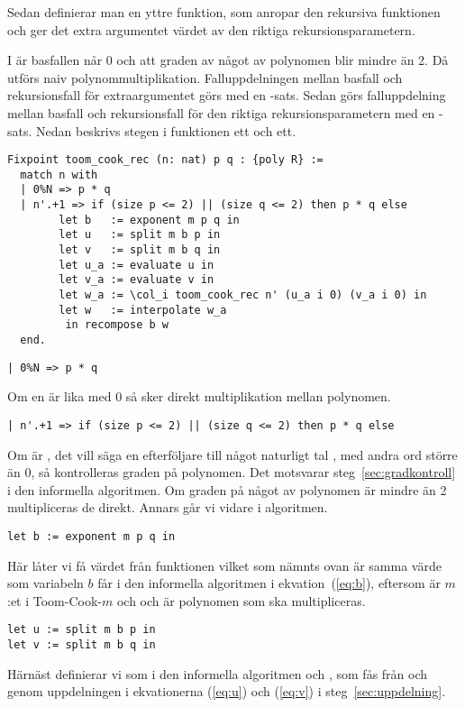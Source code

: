 Sedan definierar man en yttre funktion, som anropar den rekursiva funktionen och
ger det extra argumentet värdet av den riktiga rekursionsparametern.

I  är basfallen  når 0 och att graden av något av polynomen
blir mindre än 2. Då utförs naiv polynommultiplikation. Falluppdelningen mellan
basfall och rekursionsfall för extraargumentet  görs med en -sats.
Sedan görs falluppdelning mellan basfall och rekursionsfall för den riktiga
rekursionsparametern med en -sats. Nedan beskrivs
stegen i funktionen ett och ett.

\begin{lstlisting}
Fixpoint toom_cook_rec (n: nat) p q : {poly R} :=
  match n with
  | 0%N => p * q
  | n'.+1 => if (size p <= 2) || (size q <= 2) then p * q else
        let b   := exponent m p q in
        let u   := split m b p in
        let v   := split m b q in
        let u_a := evaluate u in
        let v_a := evaluate v in
        let w_a := \col_i toom_cook_rec n' (u_a i 0) (v_a i 0) in
        let w   := interpolate w_a
         in recompose b w
  end.
\end{lstlisting}

\begin{lstlisting}
| 0%N => p * q
\end{lstlisting}
Om en  är lika med 0 så sker direkt multiplikation mellan polynomen.

\begin{lstlisting}
| n'.+1 => if (size p <= 2) || (size q <= 2) then p * q else
\end{lstlisting}
Om  är , det vill säga en efterföljare till något naturligt tal
, med andra ord större än 0, så kontrolleras graden på polynomen. Det
motsvarar steg~\ref{sec:gradkontroll} i den informella algoritmen. Om graden på
något av polynomen är mindre än 2 multipliceras de direkt. Annars går vi vidare
i algoritmen.
\begin{lstlisting}
let b := exponent m p q in
\end{lstlisting}
Här låter vi  få värdet från funktionen  vilket som nämnts
ovan är samma värde som variabeln $b$ får i den informella algoritmen i
ekvation~(\ref{eq:b}), eftersom  är $m$:et i Toom-Cook-$m$ och  och
 är polynomen som ska multipliceras.
\begin{lstlisting}
let u := split m b p in
let v := split m b q in
\end{lstlisting}
Härnäst definierar vi som i den informella algoritmen  och , som fås
från  och  genom uppdelningen i ekvationerna (\ref{eq:u}) och
(\ref{eq:v}) i steg~\ref{sec:uppdelning}.

